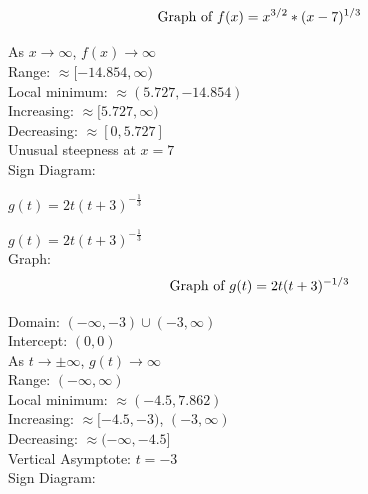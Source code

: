 \documentclass{ximera}
\begin{document}
\begin{question}
\begin{problem}
\begin{solution}
$$\text{Graph of $f(x)=x^{3/2}*(x-7)^{1/3}$}$$

As $x \rightarrow \infty$, $f(x) \rightarrow \infty$\\
Range:  $\approx [-14.854, \infty)$\\
Local minimum:  $\approx (5.727, -14.854)$\\
Increasing: $\approx [5.727, \infty)$\\
Decreasing: $\approx [0, 5.727]$\\
Unusual steepness at $x = 7$\\
Sign Diagram:\\
\begin{image}
\end{image}
\end{solution}
\end{problem}

\begin{problem} $g(t) = 2t(t+3)^{-\frac{1}{3}}$ 

\begin{solution}
$g(t) = 2t(t+3)^{-\frac{1}{3}}$ \\
Graph: \\

$$\text{Graph of $g(t)=2t(t+3)^{-1/3}$}$$

Domain: $(-\infty, -3) \cup (-3, \infty)$\\
Intercept: $(0,0)$\\
As $t \rightarrow \pm \infty$, $g(t) \rightarrow \infty$\\
Range: $(-\infty, \infty)$\\
Local minimum: $\approx (-4.5, 7.862)$\\
Increasing: $\approx [-4.5, -3)$, $(-3,\infty)$ \\
Decreasing: $\approx (-\infty, -4.5]$\\
Vertical Asymptote:  $t = -3$\\
Sign Diagram:\\
\begin{image}
\end{image}
\end{solution}
\end{problem}


\end{question}
\end{document}
